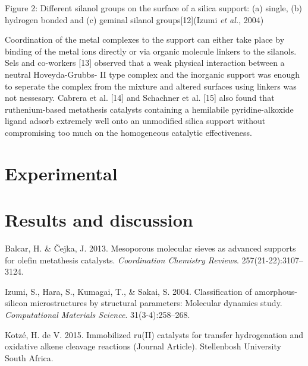\documentclass[]{article}
\begin{document}
Figure 2: Different silanol groups on the surface of a silica support:
(a) single, (b) hydrogen bonded and (c) geminal silanol
groups{[}12{]}(Izumi \emph{et al.}, 2004)

Coordination of the metal complexes to the support can either take place
by binding of the metal ions directly or via organic molecule linkers to
the silanols. Sels and co-workers {[}13{]} observed that a weak physical
interaction between a neutral Hoveyda-Grubbs- II type complex and the
inorganic support was enough to seperate the complex from the mixture
and altered surfaces using linkers was not nessesary. Cabrera et al.
{[}14{]} and Schachner et al. {[}15{]} also found that ruthenium-based
metathesis catalysts containing a hemilabile pyridine-alkoxide ligand
adsorb extremely well onto an unmodified silica support without
compromising too much on the homogeneous catalytic effectiveness.

\hypertarget{experimental}{%
\section{Experimental}\label{experimental}}

\hypertarget{results-and-discussion}{%
\section*{Results and discussion}\label{results-and-discussion}}

\hypertarget{refs}{}
\leavevmode\hypertarget{ref-RN44}{}%
Balcar, H. \& Čejka, J. 2013. Mesoporous molecular sieves as advanced
supports for olefin metathesis catalysts. \emph{Coordination Chemistry
Reviews}. 257(21-22):3107--3124.

\leavevmode\hypertarget{ref-RN96}{}%
Izumi, S., Hara, S., Kumagai, T., \& Sakai, S. 2004. Classification of
amorphous-silicon microstructures by structural parameters: Molecular
dynamics study. \emph{Computational Materials Science}.
31(3-4):258--268.

\leavevmode\hypertarget{ref-RN90}{}%
Kotzé, H. de V. 2015. Immobilized ru(II) catalysts for transfer
hydrogenation and oxidative alkene cleavage reactions (Journal Article).
Stellenbosh University South Africa.
\end{document}
